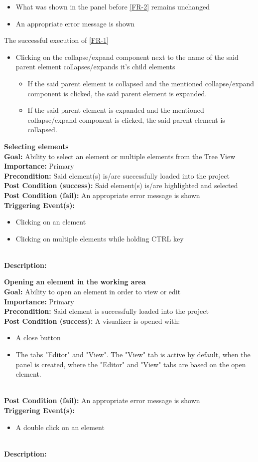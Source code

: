 \documentclass[10pt,a4paper]{report}
\newcommand{\precondition}[1]{
    \textbf{Precondition: } #1 \leavevmode \\
}
\newcommand{\FRDescription}[8]{
    \textbf{#1} \leavevmode \\
    \textbf{Goal: } #2 \leavevmode \\
    \textbf{Importance: } #3 \leavevmode \\
    \precondition{#4}
    \textbf{Post Condition (success): } #5 \leavevmode \\
    \textbf{Post Condition (fail): } #6 \leavevmode \\
    \textbf{Triggering Event(s): } #7 \leavevmode \\
    \textbf{Description: } \leavevmode \\ 
    #8}
\begin{document}
\begin{FR}
{\begin{itemize}
        \item What was shown in the panel before \ref{FR-2} remains unchanged
        \item An appropriate error message is shown
    \end{itemize}}
    {The successful execution of \ref{FR-1}}
    {\begin{itemize}
        \item Clicking on the collapse/expand component next to the name of the said parent element collapses/expands it's child elements
        \begin{itemize}
            \item If the said parent element is collapsed and the mentioned collapse/expand component is clicked, the said parent element is expanded.
            \item If the said parent element is expanded and the mentioned collapse/expand component is clicked, the said parent element is collapsed.
        \end{itemize}
    \end{itemize}}
    \item \FRDescription{Selecting elements}
    {Ability to select an element or multiple elements from the Tree View}
    {Primary}
    {Said element(s) is/are successfully loaded into the project}
    {Said element(s) is/are highlighted and selected}
    {An appropriate error message is shown}
    {\begin{itemize}
                \item Clicking on an element
                \item Clicking on multiple elements while holding CTRL key
            \end{itemize} }
    \item \FRDescription{Opening an element in the working area}
    {Ability to open an element in order to view or edit}
    {Primary}
    {Said element is successfully loaded into the project}
    {A visualizer is opened with:
    \begin{itemize}
        \item A close button 
        \item The tabs "Editor" and "View". The "View" tab is active by default, when the panel is created, where the "Editor" and "View" tabs are based on the open element.
    \end{itemize}}
    {An appropriate error message is shown}
    {\begin{itemize}
        \item A double click on an element

\end{itemize}}
\end{FR}
\end{document}
